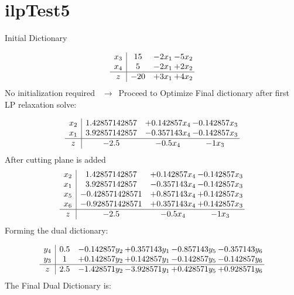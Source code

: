 \documentclass[11pt]{article}
\begin{document}
\section{ilpTest5}

Initial Dictionary 

\[\begin{array}{c| c c@{\hskip 2pt} c@{\hskip 2pt} }
 x_{3}   &  15 & -2 x_{1} & -5 x_{2}\\
 x_{4}   &  5 & -2 x_{1} & + 2 x_{2}\\
\hline
z    &  -20 & + 3 x_{1} & + 4 x_{2}\\
\end{array}\]
No initialization required \ $\rightarrow$\  Proceed to Optimize 
Final dictionary after first LP relaxation solve: 

\[\begin{array}{c| c c@{\hskip 2pt} c@{\hskip 2pt} }
 x_{2}   &  1.42857142857 & + 0.142857 x_{4} & -0.142857 x_{3}\\
 x_{1}   &  3.92857142857 & -0.357143 x_{4} & -0.142857 x_{3}\\
\hline
z    &  -2.5 & -0.5 x_{4} & -1 x_{3}\\
\end{array}\]
 After cutting plane is added 
\[\begin{array}{c| c c@{\hskip 2pt} c@{\hskip 2pt} }
 x_{2}   &  1.42857142857 & + 0.142857 x_{4} & -0.142857 x_{3}\\
 x_{1}   &  3.92857142857 & -0.357143 x_{4} & -0.142857 x_{3}\\
 x_{5}   &  -0.428571428571 & + 0.857143 x_{4} & + 0.142857 x_{3}\\
 x_{6}   &  -0.928571428571 & + 0.357143 x_{4} & + 0.142857 x_{3}\\
\hline
z    &  -2.5 & -0.5 x_{4} & -1 x_{3}\\
\end{array}\]
Forming the dual dictionary:

\[\begin{array}{c| c c@{\hskip 2pt} c@{\hskip 2pt} c@{\hskip 2pt} c@{\hskip 2pt} }
 y_{4}   &  0.5 & -0.142857 y_{2} & + 0.357143 y_{1} & -0.857143 y_{5} & -0.357143 y_{6}\\
 y_{3}   &  1 & + 0.142857 y_{2} & + 0.142857 y_{1} & -0.142857 y_{5} & -0.142857 y_{6}\\
\hline
z    &  2.5 & -1.428571 y_{2} & -3.928571 y_{1} & + 0.428571 y_{5} & + 0.928571 y_{6}\\
\end{array}\]
The Final Dual Dictionary is: 
\end{document}
